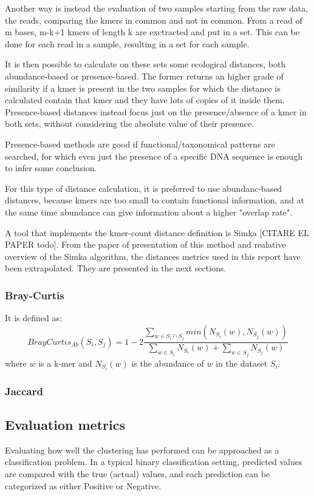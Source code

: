Another way is instead the evaluation of two samples starting from the raw data, the reads, comparing the kmers in common and not in common.
From a read of m bases, m-k+1 kmers of length k are exctracted and put in a set. This can be done for each read in a sample, resulting in a set for each sample.

It is then possible to calculate on these sets some ecological distances, both abundance-based or presence-based. The former returns an higher grade of similarity if a kmer is present in the two samples for which the distance is calculated contain that kmer and they have lots of copies of it inside them.
Presence-based distances instead focus just on the presence/absence of a kmer in both sets, without considering the absolute value of their presence.

Presence-based methods are good if functional/taxonomical patterns are searched, for which even just the presence of a specific DNA sequence is enough to infer some conclusion.

For this type of distance calculation, it is preferred to use abundanc-based distances, because kmers are too small to contain functional information, and at the same time abundance can give information about a higher "overlap rate".

A tool that implements the kmer-count distance definition is Simka [CITARE EL PAPER todo]. From the paper of presentation of this method and realative overview of the Simka algorithm, the distances metrics used in this report have been extrapolated. They are presented in the next sections.
\subsubsection{Bray-Curtis}
It is defined as:
\begin{equation}
    BrayCurtis_{Ab}(S_i, S_j) = 1 - 2\frac{\sum_{w \in S_i\cap S_j}min(N_{S_i}(w), N_{S_j}(w))}{\sum_{w \in S_i}N_{S_i}(w) + \sum_{w \in S_j}N_{S_j}(w)}
\end{equation}
where $w$ is a k-mer and $N_{S_i}(w)$ is the abundance of $w$ in the dataset $S_i$.
\subsubsection{Jaccard}

\subsection{Evaluation metrics} %
Evaluating how well the clustering has performed can be approached as a classification problem. In a typical binary classification setting, predicted values are compared with the true (actual) values, and each prediction can be categorized as either Positive or Negative.


